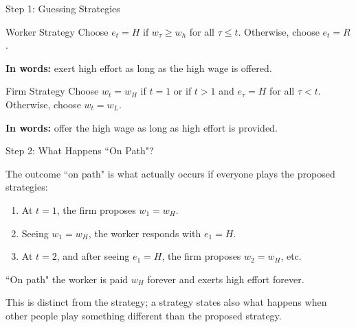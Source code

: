 \documentclass[aspectratio=169,usenames,dvipsnames]{beamer}
\newenvironment{wideitemize}{\itemize\addtolength{\itemsep}{10pt}}{\enditemize}
\begin{document}
\begin{frame}{Step 1: Guessing Strategies}
\begin{block}{Worker Strategy}
 Choose $e_t=H$ if $w_{\tau}\geq w_h$ for all $\tau \leq t$. Otherwise, choose $e_t=R$.
\end{block}
\textbf{In words:} exert high effort as long as the high wage is offered.
\begin{block}{Firm Strategy}
Choose $w_t=w_H$ if $t=1$ or if $t>1$  and $e_{\tau}=H$ for all $\tau < t$. Otherwise, choose $w_t=w_L$.
\end{block}
\textbf{In words:} offer the high wage as long as high effort is provided.
\end{frame}


\begin{frame}{Step 2: What Happens ``On Path"?}

\begin{wideitemize}
    \item The outcome ``on path" is what actually occurs if everyone plays the proposed strategies:
    \begin{enumerate}
        \item At $t=1$, the firm proposes $w_1=w_H$.
        \item Seeing $w_1=w_H$, the worker responds with $e_1=H$.
        \item At $t=2$, and after seeing $e_1=H$, the firm proposes $w_2=w_H$, etc.
    \end{enumerate}
    \item ``On path" the worker is paid $w_H$ forever and exerts high effort forever.
        \item This is distinct from the strategy; a strategy states also what happens when other people play something different than the proposed strategy.
\end{wideitemize}
\end{frame}
\end{document}
